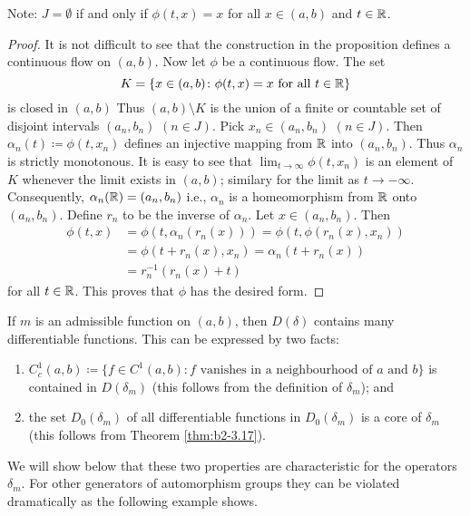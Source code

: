 Note: $J = \emptyset$ if and only if $\phi(t,x) = x$ for all $x \in (a,b)$ and $t \in \mathbb{R}$.
\begin{proof}
It is not difficult to see that the construction in the proposition defines a continuous flow on $(a,b)$.
Now let $\phi$ be a continuous flow.
The set 
\[
K = \{ x \in (a,b) \colon \phi(t,x) = x \text{ for all } t \in \mathbb{R} \} 
\]
is closed in $(a,b)$
Thus $(a,b) \setminus K$ is the union of a finite or countable set of disjoint intervals $(a_{n},b_{n})$ $(n \in J)$.
Pick $x_{n} \in (a_{n},b_{n})$ $(n \in J)$.
Then $\alpha_{n}(t) \coloneqq \phi(t,x_{n})$ defines an injective mapping from $\mathbb{R}$ into $(a_{n},b_{n})$.
Thus $\alpha_{n}$ is strictly monotonous.
It is easy to see that $\lim_{t \to \infty} \phi(t,x_{n})$ is an element of $K$ whenever the limit exists in $(a,b)$; similary for the limit as $t \to -\infty$.
Consequently, $\alpha_{n}(\mathbb{R}) = (a_{n},b_{n})$ i.e., $\alpha_{n}$ is a homeomorphism from $\mathbb{R}$ onto $(a_{n},b_{n})$.
Define $r_{n}$ to be the inverse of $\alpha_{n}$.
Let $x \in (a_{n},b_{n})$.
Then 
\begin{align*}
\phi(t,x) &= \phi(t, \alpha_{n}(r_{n}(x))) = \phi(t, \phi(r_{n}(x),x_{n})) \\
          &= \phi(t + r_{n}(x),x_{n}) = \alpha_{n}(t + r_{n}(x)) \\
          &= r_{n}^{-1}(r_{n}(x) + t)	
\end{align*}
for all $t \in \mathbb{R}$.
This proves that $\phi$ has the desired form.
\end{proof}
If $m$ is an admissible function on $(a,b)$, then $D(\delta)$ contains many differentiable functions.
This can be expressed by two facts:
\begin{enumerate}[\upshape (i)]
\item \label{enum:b2-3-1.1}
$C_{c}^{1}(a,b) \coloneqq \{ f \in C^{1}(a,b) \colon f \text{ vanishes in a neighbourhood of } a \text{ and } b\}$ is contained in $D(\delta_{m})$ (this follows from the definition of $\delta_{m}$); and
\item  \label{enum:b2-3-1.2}
the set $D_{0}(\delta_{m})$ of all differentiable functions in $D_{0}(\delta_{m})$ is a core of $\delta_{m}$ (this follows from Theorem \ref{thm:b2-3.17}).
\end{enumerate}
We will show below that these two properties are characteristic for the operators $\delta_{m}$.
For other generators of automorphism groups they can be violated dramatically as the following example shows.
